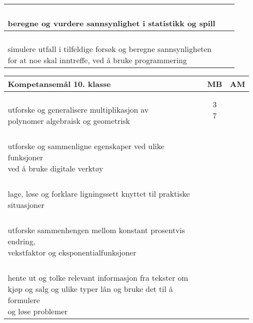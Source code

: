 \begin{center}
\begin{tabular}{p{10.5cm} | c | c |}
		\shortstack[l]{\\ beregne og vurdere sannsynlighet i statistikk og spill
		} &\shortstack{} &\shortstack{7} \\ \hline
		
		\shortstack[l]{\\ simulere utfall i tilfeldige forsøk og beregne sannsynligheten \\for at noe skal inntreffe, ved å bruke programmering
		} &\shortstack{} &\shortstack{} \\ \hline	
	\end{tabular}	
\end{center}

\begin{center}
	\begin{tabular}{p{10.5cm} | c | c |} 
		\textbf{Kompetansemål 10. klasse} & \textbf{MB} & \textbf{AM}\\ \hline
		\shortstack[l]{\\ utforske og generalisere multiplikasjon av\\ polynomer algebraisk og geometrisk
		} &\shortstack{3\\7} &\shortstack{} \\ \hline
		
		\shortstack[l]{\\ utforske og sammenligne egenskaper ved ulike funksjoner \\ved å bruke digitale verktøy
		} &\shortstack{} &\shortstack{G} \\ \hline
		
		\shortstack[l]{\\ lage, løse og forklare ligningssett knyttet til praktiske \\situasjoner
		} &\shortstack{} &\shortstack{} \\ \hline
		
		\shortstack[l]{\\ utforske sammenhengen mellom konstant prosentvis endring,\\ vekstfaktor og eksponentialfunksjoner
		} &\shortstack{} &\shortstack{4} \\ \hline
		
		\shortstack[l]{\\ hente ut og tolke relevant informasjon fra tekster om\\ kjøp og salg og ulike typer lån og bruke det til å formulere \\og løse problemer
		} &\shortstack{} &\shortstack{6} \\ \hline
		

\end{tabular}
\end{center}
